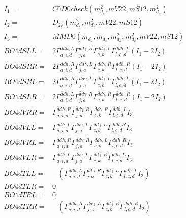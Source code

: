 \documentclass[A4,landscape]{article}
\begin{document}
\begin{align} 
I_1 = & C0D0check(m^2_{d_{{c}}}, mV22, mS12, m^2_{d_{{a}}}) \\ 
I_2 = & D_{27}(m^2_{d_{{a}}}, m^2_{d_{{c}}}, mV22, mS12) \\ 
I_3 = & MMD0(m_{d_{{a}}}, m_{d_{{c}}}, m^2_{d_{{a}}}, m^2_{d_{{c}}}, mV22, mS12) \\ 
  BO4dSLL= & 2  \Gamma^{\bar{d}d h ,L}_{a, i, d} \Gamma^{\bar{d}d \gamma ,R}_{j, a} \Gamma^{\bar{d}d \gamma ,L}_{c, k} \Gamma^{\bar{d}d h ,L}_{l, c, d} (I_1 - 2 I_2) \\ 
  BO4dSRR= & 2  \Gamma^{\bar{d}d h ,R}_{a, i, d} \Gamma^{\bar{d}d \gamma ,L}_{j, a} \Gamma^{\bar{d}d \gamma ,R}_{c, k} \Gamma^{\bar{d}d h ,R}_{l, c, d} (I_1 - 2 I_2) \\ 
  BO4dSRL= & 2  \Gamma^{\bar{d}d h ,R}_{a, i, d} \Gamma^{\bar{d}d \gamma ,L}_{j, a} \Gamma^{\bar{d}d \gamma ,L}_{c, k} \Gamma^{\bar{d}d h ,L}_{l, c, d} (I_1 - 2 I_2) \\ 
  BO4dSLR= & 2  \Gamma^{\bar{d}d h ,L}_{a, i, d} \Gamma^{\bar{d}d \gamma ,R}_{j, a} \Gamma^{\bar{d}d \gamma ,R}_{c, k} \Gamma^{\bar{d}d h ,R}_{l, c, d} (I_1 - 2 I_2) \\ 
  BO4dVRR= &  \Gamma^{\bar{d}d h ,R}_{a, i, d} \Gamma^{\bar{d}d \gamma ,R}_{j, a} \Gamma^{\bar{d}d \gamma ,R}_{c, k} \Gamma^{\bar{d}d h ,L}_{l, c, d} I_3 \\ 
  BO4dVLL= &  \Gamma^{\bar{d}d h ,L}_{a, i, d} \Gamma^{\bar{d}d \gamma ,L}_{j, a} \Gamma^{\bar{d}d \gamma ,L}_{c, k} \Gamma^{\bar{d}d h ,R}_{l, c, d} I_3 \\ 
  BO4dVRL= &  \Gamma^{\bar{d}d h ,R}_{a, i, d} \Gamma^{\bar{d}d \gamma ,R}_{j, a} \Gamma^{\bar{d}d \gamma ,L}_{c, k} \Gamma^{\bar{d}d h ,R}_{l, c, d} I_3 \\ 
  BO4dVLR= &  \Gamma^{\bar{d}d h ,L}_{a, i, d} \Gamma^{\bar{d}d \gamma ,L}_{j, a} \Gamma^{\bar{d}d \gamma ,R}_{c, k} \Gamma^{\bar{d}d h ,L}_{l, c, d} I_3 \\ 
  BO4dTLL= & -( \Gamma^{\bar{d}d h ,L}_{a, i, d} \Gamma^{\bar{d}d \gamma ,R}_{j, a} \Gamma^{\bar{d}d \gamma ,L}_{c, k} \Gamma^{\bar{d}d h ,L}_{l, c, d} I_2) \\ 
  BO4dTLR= & 0 \\ 
  BO4dTRL= & 0 \\ 
  BO4dTRR= & -( \Gamma^{\bar{d}d h ,R}_{a, i, d} \Gamma^{\bar{d}d \gamma ,L}_{j, a} \Gamma^{\bar{d}d \gamma ,R}_{c, k} \Gamma^{\bar{d}d h ,R}_{l, c, d} I_2) \\ 
\end{align} 
\end{document}
